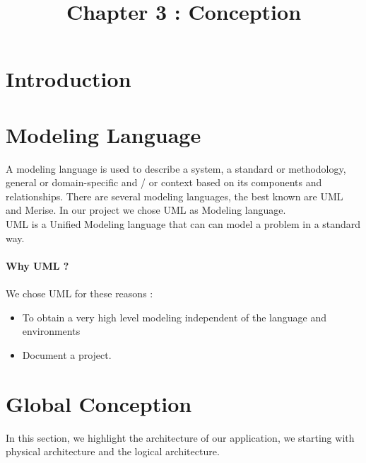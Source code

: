 \documentclass[12pt]{article}
\begin{document}
	\listoffigures
	\title{Chapter 3 : Conception}
	\maketitle
	
	\section{Introduction}

	\section{Modeling Language}
		A modeling language is used to describe a system, a standard or methodology, general or domain-specific and / or context based on its components and relationships.
	There are several modeling languages, the best known are UML and Merise. In our project we chose UML as Modeling language.
	\\
	UML is a Unified Modeling language that can can model a problem in a standard way.
	\\
	\\
	\textbf{Why UML ?}
	\\
	\\
	We chose UML for these reasons : 
	\begin{itemize}
	\item To obtain a very high level modeling independent of the language and environments
	\item Document a project. 
	\end{itemize}
	
	\section{Global Conception}
	In this section, we highlight the architecture of our application, we starting  with physical architecture and the logical architecture.
	
	\clearpage
	\newpage
\end{document}
